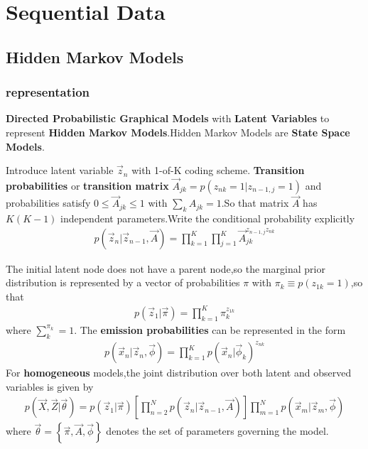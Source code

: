 \chapter{Sequential Data}
\label{chap:Sequential Data}
\section{Hidden Markov Models}
\subsection{representation}
	\textbf{Directed Probabilistic Graphical Models} with \textbf{Latent Variables} to represent \textbf{Hidden Markov Models}.Hidden Markov Models are \textbf{State Space Models}.

	Introduce latent variable $\vec{z}_n$ with 1-of-K coding scheme.
	\textbf{Transition probabilities} or \textbf{transition matrix} $\vec{A}_{jk} = p(z_{nk}=1|z_{n-1,j}=1)$ and probabilities satisfy
$0\leq \vec{A}_{jk}\leq 1$ with $\sum_k{A_{jk}} = 1$.So that matrix $\vec{A}$ has $K(K-1)$ independent parameters.Write the conditional probability explicitly
\begin{align}
p(\vec{z}_n|\vec{z}_{n-1},\vec{A}) = \prod_{k=1}^{K}\prod_{j=1}^{K}\vec{A}_{jk}^{z_{n-1,j}z_{nk}}
\end{align}

The initial latent node does not have a parent node,so the marginal prior distribution is represented by a vector of probabilities $\pi$ with $\pi_k\equiv p(z_{1k}=1)$,so that
\begin{align}
p(\vec{z}_1|\vec{\pi}) = \prod_{k=1}^{K}\pi_k^{z_{1k}}
\end{align}
where $\sum_{k}^{\pi_k}=1$.
The \textbf{emission probabilities} can be represented in the form
\begin{align}
p(\vec{x}_n|\vec{z}_n,\vec{\phi})=\prod_{k=1}^{K}p(\vec{x}_n|\vec{\phi}_k)^{z_{nk}}
\end{align}
For \textbf{homogeneous} models,the joint distribution over both latent and observed variables is given by
\begin{align}\label{eqn:hmm joint distribution}
p(\vec{X},\vec{Z}|\vec{\theta})=p(\vec{z}_1|\vec{\pi})\left[\prod_{n=2}^{N}p(\vec{z}_n|\vec{z}_{n-1},\vec{A}) \right]
\prod_{m=1}^{N}p(\vec{x}_m|\vec{z}_m,\vec{\phi})
\end{align}
where $\vec{\theta} = \left\{\vec{\pi},\vec{A},\vec{\phi} \right\}$ denotes the set of parameters governing the model.

